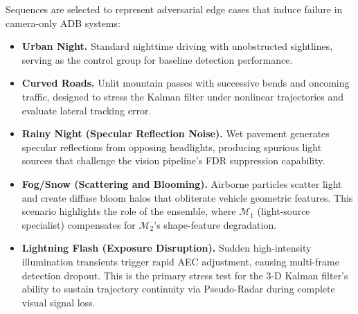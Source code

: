 \documentclass{jstarticle}
\theoremstyle{remark}
\begin{document}
Sequences are selected to represent adversarial edge cases that induce
failure in camera-only ADB systems:

\begin{itemize}
    \item \textbf{Urban Night.} Standard nighttime driving with
    unobstructed sightlines, serving as the control group for baseline
    detection performance.

    \item \textbf{Curved Roads.} Unlit mountain passes with successive
    bends and oncoming traffic, designed to stress the Kalman filter
    under nonlinear trajectories and evaluate lateral tracking error.

    \item \textbf{Rainy Night (Specular Reflection Noise).} Wet
    pavement generates specular reflections from opposing headlights,
    producing spurious light sources that challenge the vision pipeline's
    FDR suppression capability.

    \item \textbf{Fog/Snow (Scattering and Blooming).} Airborne
    particles scatter light and create diffuse bloom halos that
    obliterate vehicle geometric features. This scenario highlights the
    role of the ensemble, where $\mathcal{M}_1$ (light-source
    specialist) compensates for $\mathcal{M}_2$'s shape-feature
    degradation.

    \item \textbf{Lightning Flash (Exposure Disruption).} Sudden
    high-intensity illumination transients trigger rapid AEC adjustment,
    causing multi-frame detection dropout. This is the primary stress
    test for the 3-D Kalman filter's ability to sustain trajectory
    continuity via Pseudo-Radar during complete visual signal loss.
\end{itemize}
\end{document}
